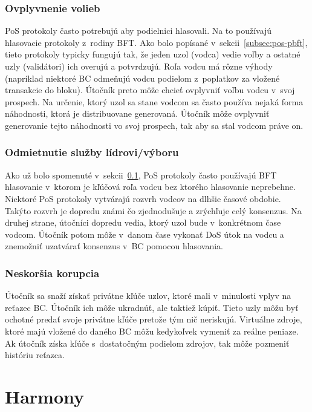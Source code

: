 \subsection{Ovplyvnenie volieb}\label{subsec:grinding-attack}
PoS protokoly často potrebujú aby podielnici hlasovali. Na to používajú hlasovacie protokoly z~rodiny BFT. Ako bolo popísané v~sekcii~\ref{subsec:pos-pbft}, tieto protokoly typicky fungujú tak, že jeden uzol (vodca) vedie voľby a ostatné uzly (validátori) ich overujú a potvrdzujú. Roľa vodcu má rôzne výhody (napríklad niektoré BC odmeňujú vodcu podielom z~poplatkov za vložené transakcie do bloku). Útočník preto môže chcieť ovplyvniť voľbu vodcu v~svoj prospech. Na určenie, ktorý uzol sa stane vodcom sa často používa nejaká forma náhodnosti, ktorá je distribuovane generovaná. Útočník môže ovplyvniť generovanie tejto náhodnosti vo svoj prospech, tak aby sa stal vodcom práve on.

\subsection{Odmietnutie služby lídrovi/výboru}\label{subsec:leader-dos}

Ako už bolo spomenuté v~sekcii~\ref{subsec:grinding-attack}, PoS protokoly často používajú BFT hlasovanie v~ktorom je kľúčová roľa vodcu bez ktorého hlasovanie neprebehne. Niektoré PoS protokoly vytvárajú rozvrh vodcov na dlhšie časové obdobie. Takýto rozvrh je dopredu známi čo zjednodušuje a zrýchľuje celý konsenzus. Na druhej strane, útočníci dopredu vedia, ktorý uzol bude v~konkrétnom čase vodcom. Útočník potom môže v~danom čase vykonať DoS útok na vodcu a znemožniť uzatvárať konsenzus v~BC pomocou hlasovania.

\subsection{Neskoršia korupcia}
Útočník sa snaží získať privátne kľúče uzlov, ktoré mali v~minulosti vplyv na reťazec BC. Útočník ich môže ukradnúť, ale taktiež kúpiť. Tieto uzly môžu byť ochotné predať svoje privátne kľúče pretože tým nič neriskujú. Virtuálne zdroje, ktoré majú vložené do daného BC môžu kedykoľvek vymeniť za reálne peniaze. Ak útočník získa kľúče s~dostatočným podielom zdrojov, tak môže pozmeniť históriu reťazca.

\chapter{Harmony}\label{chap:harmony}

